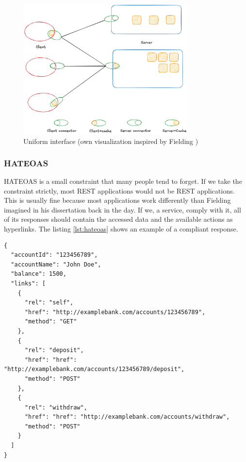 \begin{figure}[!h]
\centering
\includegraphics[width=0.8\textwidth, keepaspectratio]{figures/uniform-interface.png}
\caption{Uniform interface (own visualization inspired by Fielding \cite{fielding2000})}
\label{fig:uniform-interface}
\end{figure}

\subsubsection{HATEOAS}

HATEOAS is a small constraint that many people tend to forget. If we take the constraint strictly, most REST applications would not be REST applications. This is usually fine because most applications work differently than Fielding imagined in his dissertation back in the day. If we, a service, comply with it, all of its responses should contain the accessed data and the available actions as hyperlinks. The listing \ref{lst:hateoas} shows an example of a compliant response.

\begin{lstlisting}[caption=An HATEOAS response in JSON format,label=lst:hateoas, float]
{
  "accountId": "123456789",
  "accountName": "John Doe",
  "balance": 1500,
  "links": [
    {
      "rel": "self",
      "href": "http://examplebank.com/accounts/123456789",
      "method": "GET"
    },
    {
      "rel": "deposit",
      "href": "href": "http://examplebank.com/accounts/123456789/deposit",
      "method": "POST"
    },
    {
      "rel": "withdraw",
      "href": "href": "http://examplebank.com/accounts/withdraw",
      "method": "POST"
    }
  ]
}
\end{lstlisting}

